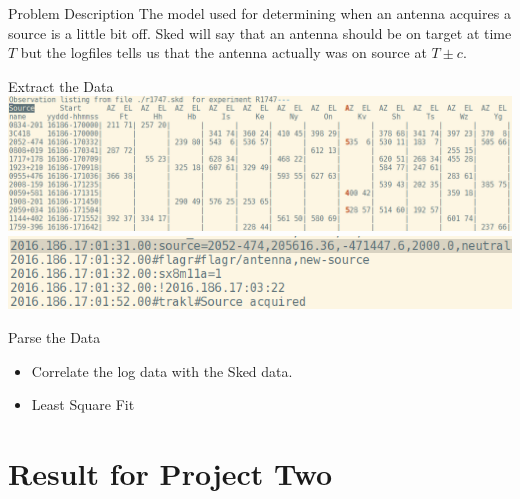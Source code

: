 \documentclass{beamer}
\begin{document}
    \begin{frame}{Problem Description}
        The model used for determining when an antenna acquires a source is a
        little bit off. Sked will say that an antenna should be on target at
        time $T$ but the logfiles tells us that the antenna actually was on
        source at $T \pm c$.
    \end{frame}
    \begin{frame}{Extract the Data}
        \centering
        \includegraphics[width=1\columnwidth]{skds}\\[2ex]
        \includegraphics[width=0.75\columnwidth]{logs}
    \end{frame}
    \begin{frame}{Parse the Data}
        \begin{itemize}[<+-|alert@+>]
            \item Correlate the log data with the Sked data.
            \item Least Square Fit
        \end{itemize}
    \end{frame}


    \section{Result for Project Two}

\end{document}
